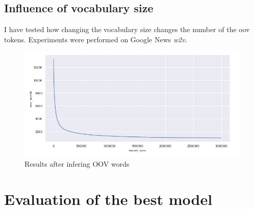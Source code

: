 \documentclass{article}
\begin{document}
\subsection{Influence of vocabulary size}
I have tested how changing the vocabulary size changes the number of the oov tokens.
Experiments were performed on Google News \textit{w2v}.
\begin{figure}[h]
    \centering
    \includegraphics[scale=0.5]{../figures/vocab_size.png}
    \caption{Results after infering OOV words}
\end{figure}

\newpage
\section{Evaluation of the best model}
\end{document}
